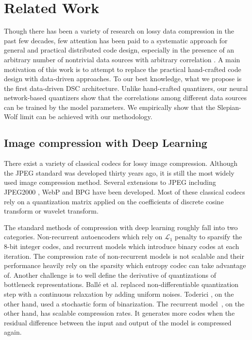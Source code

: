 \documentclass[10pt,twocolumn,letterpaper]{article}
\begin{document}
\section{Related Work}
Though there has been a variety of research on lossy data compression in the past few decades, few attention has been paid to a systematic approach for general and practical distributed code design, especially in the presence of an arbitrary number of nontrivial data sources with arbitrary correlation %
\cite{xiong2004distributed}. 
A main motivation of this work is to attempt to replace the practical hand-crafted code design with data-driven approaches. 
To our best knowledge, what we propose is the first data-driven DSC architecture. 
Unlike hand-crafted quantizers, our neural network-based quantizers show that the correlations among different data sources can be trained by the model parameters. We empirically show that the Slepian-Wolf limit can be achieved with our methodology. 

\subsection{Image compression with Deep Learning}
There exist a variety of classical codecs for lossy image compression. Although the JPEG standard \cite{wallace1992jpeg} was developed thirty years ago, it is still the most widely used image compression method. Several extensions to JPEG including JPEG2000 \cite{skodras2001jpeg}, WebP \cite{google2010webp} and BPG \cite{bellard2014bpg} have been developed. Most of these classical codecs rely on a quantization matrix applied on the coefficients of discrete cosine transform or wavelet transform.

The standard methods of compression with deep learning roughly fall into two categories. Non-recurrent autoencoders which rely on $\mathcal{L}_1$ penalty to sparsify the 8-bit integer codes, and recurrent models which introduce binary codes at each iteration. 
The compression rate of non-recurrent models is not scalable and their performance heavily rely on the sparsity which entropy codec can take advantage of. 
Another challenge is to well define the derivative of quantizations of bottleneck representations. Ball\'e et al. \cite{balle2016end} replaced non-differentiable quantization step with a continuous relaxation by adding uniform noises. Toderici \cite{toderici2015variable}, on the other hand, used a stochastic form of binarization. 
The recurrent model~\cite{toderici2015variable,johnston2017improved}, on the other hand, has scalable compression rates. It generates more codes when the residual difference between the input and output of the model is compressed again.
\end{document}
